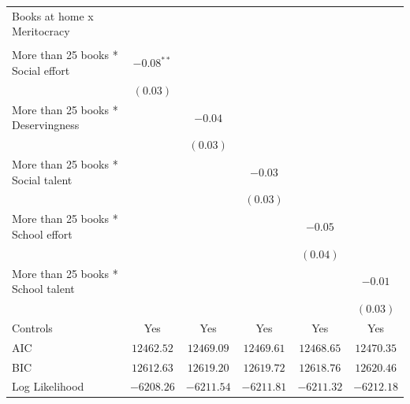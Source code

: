 \documentclass[
  12pt,
  letterpaper,
]{article}
\begin{document}
\begin{table}
{\begin{center}
{\begin{threeparttable}
\begin{tabular}{l c c c c c}
Books at home x Meritocracy                 &               &               &               &               &               \\
                                            &               &               &               &               &               \\
\quad More than 25 books * Social effort    & $-0.08^{**}$  &               &               &               &               \\
                                            & $(0.03)$      &               &               &               &               \\
\quad More than 25 books * Deservingness    &               & $-0.04$       &               &               &               \\
                                            &               & $(0.03)$      &               &               &               \\
\quad More than 25 books * Social talent    &               &               & $-0.03$       &               &               \\
                                            &               &               & $(0.03)$      &               &               \\
\quad More than 25 books * School effort    &               &               &               & $-0.05$       &               \\
                                            &               &               &               & $(0.04)$      &               \\
\quad More than 25 books * School talent    &               &               &               &               & $-0.01$       \\
                                            &               &               &               &               & $(0.03)$      \\
\midrule
Controls                                    & Yes           & Yes           & Yes           & Yes           & Yes           \\
AIC                                         & $12462.52$    & $12469.09$    & $12469.61$    & $12468.65$    & $12470.35$    \\
BIC                                         & $12612.63$    & $12619.20$    & $12619.72$    & $12618.76$    & $12620.46$    \\
Log Likelihood                              & $-6208.26$    & $-6211.54$    & $-6211.81$    & $-6211.32$    & $-6212.18$    \\

\end{tabular}
\end{threeparttable}}
\end{center}}
\end{table}
\end{document}

